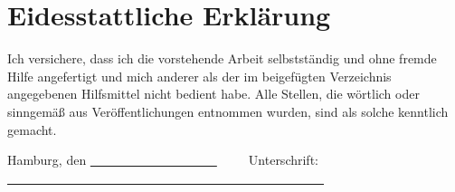 \newpage
\thispagestyle{empty}
\section*{Eidesstattliche Erklärung}\label{eid}

Ich versichere, dass ich die vorstehende Arbeit selbstständig und ohne fremde Hilfe angefertigt und mich anderer als der im beigefügten Verzeichnis angegebenen Hilfsmittel nicht bedient habe. Alle Stellen, die wörtlich oder sinngemäß aus Veröffentlichungen entnommen wurden, sind als solche kenntlich gemacht. \\


\vspace{2cm}

\noindent Hamburg, den \uline{~~~~~~~~~~~~~~~~~~~~}~~~~~Unterschrift: \uline{~~~~~~~~~~~~~~~~~~~~~~~~~~~~~~~~~~~~~~~~~~~~~~~~~~}
